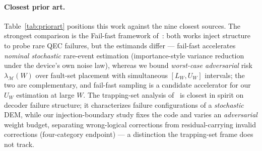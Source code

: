 \documentclass[11pt,a4paper]{article}
\begin{document}
\paragraph{Closest prior art.}
Table~\ref{tab:priorart} positions this work against the nine closest
sources. The strongest comparison is the Fail-fast framework
of~\cite{beverland2025failfast}: both works inject structure to probe
rare QEC failures, but the estimands differ --- fail-fast accelerates
\emph{nominal stochastic} rare-event estimation (importance-style
variance reduction under the device's own noise law), whereas we bound
\emph{worst-case adversarial} risk $\lambda_{\mathcal{M}}(W)$ over
fault-set placement with simultaneous $[L_W,U_W]$ intervals; the two
are complementary, and fail-fast sampling is a candidate accelerator
for our $U_W$ estimation at large $W$. The trapping-set analysis
of~\cite{Pacenti2026trapping} is closest in spirit on decoder failure
structure; it characterizes failure configurations of a
\emph{stochastic} DEM, while our injection-boundary study fixes the
code and varies an \emph{adversarial} weight budget, separating
wrong-logical corrections from residual-carrying invalid corrections
(four-category endpoint) --- a distinction the trapping-set frame does
not track.
\end{document}
